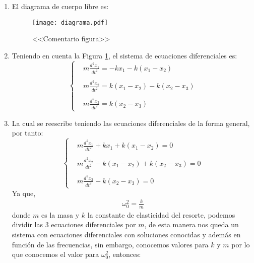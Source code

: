 \begin{multicols}{2}
\begin{enumerate}[leftmargin=15pt]
    \item El diagrama de cuerpo libre es:
    \begin{figure}[H]
        \begin{center}
        \texttt{[image: diagrama.pdf]}
        \caption{<<Comentario figura>>}
        \label{diagrama}
        \end{center}
    \end{figure}
    \item Teniendo en cuenta la Figura \ref{diagrama}, el sistema de ecuaciones diferenciales es:
    \begin{equation*}
        \begin{cases}
            &m \displaystyle\frac{d^{2}x_{1}}{dt^{2}} = -kx_{1} - k(x_1 - x_2)\\
            \\
            &m \displaystyle\frac{d^{2}x_{2}}{dt^{2}} = k(x_1 - x_2) - k(x_2 - x_3)\\
            \\
            &m \displaystyle\frac{d^{2}x_{3}}{dt^{2}} = k(x_2 - x_3)
        \end{cases}
    \end{equation*}
    \item La cual se reescribe teniendo las ecuaciones diferenciales de la forma general, por tanto:
    \begin{equation*}
        \begin{cases}
            &m \displaystyle\frac{d^{2}x_{1}}{dt^{2}} + kx_{1} + k(x_1 - x_2) = 0\\
            \\
            &m \displaystyle\frac{d^{2}x_{2}}{dt^{2}} - k(x_1 - x_2) + k(x_2 - x_3) = 0\\
            \\
            &m \displaystyle\frac{d^{2}x_{3}}{dt^{2}} - k(x_2 - x_3) = 0
        \end{cases}
    \end{equation*}
    Ya que,
    \begin{align*}
        \omega^{2}_{0} = \frac{k}{m}
    \end{align*}
    donde $m$ es la masa y $k$ la constante de elasticidad del resorte, podemos dividir las 3 ecuaciones diferenciales por $m$, de esta manera nos queda un sistema con ecuaciones diferenciales con soluciones conocidas y además en función de las frecuencias, sin embargo, conocemos valores para $k$ y $m$ por lo que conocemos el valor para $\omega^{2}_{0}$, entonces:

\end{enumerate}
\end{multicols}
